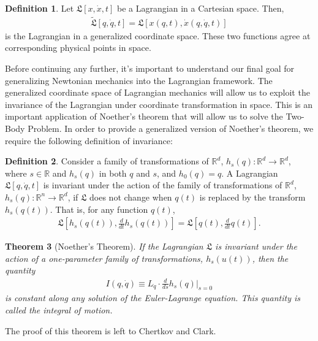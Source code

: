 \documentclass[10pt, psamsfonts]{amsart}
\newtheorem{thm}{Theorem}[section]
\theoremstyle{definition}
\newtheorem{defn}[thm]{Definition}
\theoremstyle{remark}
\numberwithin{equation}{section}
\begin{document}
\begin{defn}
Let $\mathfrak{L}[x, \dot{x}, t]$ be a Lagrangian in a Cartesian space. Then, 
\begin{align*}
  \tilde{\mathfrak{L}}[q, \dot{q}, t] = \mathfrak{L}[x(q,t), \dot{x}(q, \dot{q}, t)] 
\end{align*}
is the Lagrangian in a generalized coordinate space. These two functions agree at corresponding physical points in space.
\end{defn}

Before continuing any further, it's important to understand our final goal for generalizing Newtonian mechanics into the Lagrangian framework. The generalized coordinate space of Lagrangian mechanics will allow us to exploit the invariance of the Lagrangian under coordinate transformation in space. This is an important application of Noether's theorem that will allow us to solve the Two-Body Problem. In order to provide a generalized version of Noether's theorem, we require the following definition of invariance:

\begin{defn}
Consider a family of transformations of $\mathbb{R}^d$, $h_s(q):\mathbb{R}^d \to \mathbb{R}^d $, where $s \in \mathbb{R}$ and $h_s(q)$ in both $q$ and $s$, and $h_0(q) = q$. A Lagrangian $\mathfrak{L}[q, \dot{q}, t]$ is invariant under the action of the family of transformations of $\mathbb{R}^d$, $h_s(q): \mathbb{R}^n \to \mathbb{R}^d$, if $\mathfrak{L}$ does not change when $q(t)$ is replaced by the transform $h_s(q(t))$. That is, for any function $q(t)$,
\begin{align*}
  \mathfrak{L}[h_s(q(t)), \frac{d}{dt} h_s(q(t))] = \mathfrak{L}[q(t), \frac{d}{dt} q(t)].
\end{align*}
\end{defn}

\begin{thm}[Noether's Theorem]
If the Lagrangian $\mathfrak{L}$ is invariant under the action of a one-parameter family of transformations, $h_s(u(t))$, then the quantity
\begin{align*}
  I(q, \dot{q}) \equiv L_{\dot{q}} \cdot \frac{d}{ds} h_s(q) \bigg|_{s=0}
\end{align*}
is constant along any solution of the Euler-Lagrange equation. This quantity is called the integral of motion.
\end{thm}
\noindent The proof of this theorem is left to Chertkov and Clark.
\end{document}
